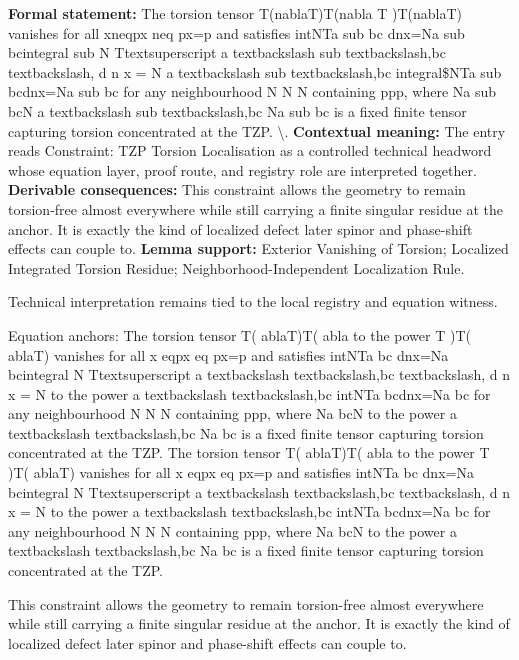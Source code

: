 \begingroup\footnotesize\setlength{\emergencystretch}{3em}\sloppy
\textbf{Formal statement:} The torsion tensor T(nablaT)T(nabla T )T(nablaT) vanishes for all xneqpx neq px=p and satisfies intNTa sub bc dnx=Na sub bcintegral sub N Ttextsuperscript a textbackslash sub textbackslash,bc textbackslash, d n x = N a textbackslash sub textbackslash,bc integral\$NTa sub bcdnx=Na sub bc for any neighbourhood N N N containing ppp, where Na sub bcN a textbackslash sub textbackslash,bc Na sub bc is a fixed finite tensor capturing torsion concentrated at the TZP. \textbackslash{}. \textbf{Contextual meaning:} The entry reads Constraint: TZP Torsion Localisation as a controlled technical headword whose equation layer, proof route, and registry role are interpreted together. \textbf{Derivable consequences:} This constraint allows the geometry to remain torsion-free almost everywhere while still carrying a finite singular residue at the anchor. It is exactly the kind of localized defect later spinor and phase-shift effects can couple to. \textbf{Lemma support:} Exterior Vanishing of Torsion; Localized Integrated Torsion Residue; Neighborhood-Independent Localization Rule.\par
\endgroup

Technical interpretation remains tied to the local registry and equation witness.

Equation anchors: The torsion tensor T( ablaT)T( abla to the power T )T( ablaT) vanishes for all x eqpx eq px=p and satisfies intNTa bc dnx=Na bcintegral N Ttextsuperscript a textbackslash textbackslash,bc textbackslash, d n x = N to the power a textbackslash textbackslash,bc intNTa bcdnx=Na bc for any neighbourhood N N N containing ppp, where Na bcN to the power a textbackslash textbackslash,bc Na bc is a fixed finite tensor capturing torsion concentrated at the TZP. The torsion tensor T( ablaT)T( abla to the power T )T( ablaT) vanishes for all x eqpx eq px=p and satisfies intNTa bc dnx=Na bcintegral N Ttextsuperscript a textbackslash textbackslash,bc textbackslash, d n x = N to the power a textbackslash textbackslash,bc intNTa bcdnx=Na bc for any neighbourhood N N N containing ppp, where Na bcN to the power a textbackslash textbackslash,bc Na bc is a fixed finite tensor capturing torsion concentrated at the TZP.

This constraint allows the geometry to remain torsion-free almost everywhere while still carrying a finite singular residue at the anchor. It is exactly the kind of localized defect later spinor and phase-shift effects can couple to.
\endgroup

